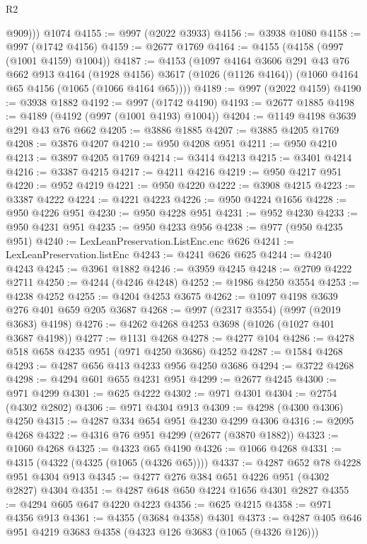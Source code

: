 \begin{lexlean}{R2}
\begin{coremodule}
          @909)))
    @1074
@4155 := @997 (@2022 @3933)
@4156 := @3938 @1080
@4158 := @997 (@1742 @4156)
@4159 := @2677 @1769
@4164 := @4155 (@4158 (@997 (@1001 @4159) @1004))
@4187 := @4153
    (@1097
      @4164
      @3606
      @291
      @43
      @76
      @662
      @913
      @4164
      (@1928 @4156)
      @3617
      (@1026 (@1126 @4164))
      (@1060 @4164 @65 @4156 (@1065 (@1066 @4164 @65))))
@4189 := @997 (@2022 @4159)
@4190 := @3938 @1882
@4192 := @997 (@1742 @4190)
@4193 := @2677 @1885
@4198 := @4189 (@4192 (@997 (@1001 @4193) @1004))
@4204 := @1149 @4198 @3639 @291 @43 @76 @662
@4205 := @3886 @1885
@4207 := @3885 @4205 @1769
@4208 := @3876 @4207
@4210 := @950 @4208 @951
@4211 := @950 @4210
@4213 := @3897 @4205 @1769
@4214 := @3414 @4213
@4215 := @3401 @4214
@4216 := @3387 @4215
@4217 := @4211 @4216
@4219 := @950 @4217 @951
@4220 := @952 @4219
@4221 := @950 @4220
@4222 := @3908 @4215
@4223 := @3387 @4222
@4224 := @4221 @4223
@4226 := @950 @4224 @1656
@4228 := @950 @4226 @951
@4230 := @950 @4228 @951
@4231 := @952 @4230
@4233 := @950 @4231 @951
@4235 := @950 @4233 @956
@4238 := @977 (@950 @4235 @951)
@4240 := LexLeanPreservation.ListEnc.enc @626
@4241 := LexLeanPreservation.listEnc
@4243 := @4241 @626 @625
@4244 := @4240 @4243
@4245 := @3961 @1882
@4246 := @3959 @4245
@4248 := @2709 @4222 @2711
@4250 := @4244 (@4246 @4248)
@4252 := @1986 @4250 @3554
@4253 := @4238 @4252
@4255 := @4204 @4253 @3675
@4262 := @1097 @4198 @3639 @276 @401 @659 @205 @3687
@4268 := @997 (@2317 @3554) (@997 (@2019 @3683) @4198)
@4276 := @4262 @4268 @4253 @3698 (@1026 (@1027 @401 @3687 @4198))
@4277 := @1131 @4268
@4278 := @4277 @104
@4286 := @4278 @518 @658 @4235 @951 (@971 @4250 @3686) @4252
@4287 := @1584 @4268
@4293 := @4287 @656 @413 @4233 @956 @4250 @3686
@4294 := @3722 @4268
@4298 := @4294 @601 @655 @4231 @951
@4299 := @2677 @4245
@4300 := @971 @4299
@4301 := @625 @4222
@4302 := @971 @4301
@4304 := @2754 (@4302 @2802)
@4306 := @971 @4304 @913
@4309 := @4298 (@4300 @4306) @4250
@4315 := @4287 @334 @654 @951 @4230 @4299 @4306
@4316 := @2095 @4268
@4322 := @4316 @76 @951 @4299 (@2677 (@3870 @1882))
@4323 := @1060 @4268
@4325 := @4323 @65 @4190
@4326 := @1066 @4268
@4331 := @4315 (@4322 (@4325 (@1065 (@4326 @65))))
@4337 := @4287 @652 @78 @4228 @951 @4304 @913
@4345 := @4277 @276 @384 @651 @4226 @951 (@4302 @2827) @4304
@4351 := @4287 @648 @650 @4224 @1656 @4301 @2827
@4355 := @4294 @605 @647 @4220 @4223
@4356 := @625 @4215
@4358 := @971 @4356 @913
@4361 := @4355 (@3684 @4358) @4301
@4373 := @4287 @405 @646 @951 @4219 @3683 @4358 (@4323 @126 @3683 (@1065 (@4326 @126)))

\end{coremodule}
\end{lexlean}
